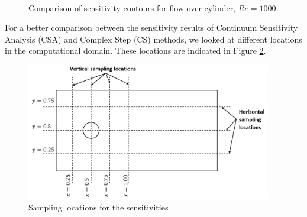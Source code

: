 \documentclass[12pt]{aiaa-pretty}
\begin{document}
\begin{figure}[H]
{	}
	\\
	\quad
	\caption{Comparison of sensitivity contours for flow over cylinder, $Re = 1000$.}
	\label{fig:cylinderSensitivityContourRE1000}
\end{figure}
%

For a better comparison between the sensitivity results of Continuum Sensitivity Analysis (CSA) and Complex Step (CS) methods, we looked at different locations in the computational domain. These locations are indicated in Figure \ref{fig:cylinderSampleLocations}.

%
\begin{figure}[H]
	\centering
	\includegraphics[height=6.0cm]{figure/cylinder/sampling_location.png}
	\caption{Sampling locations for the sensitivities}
	\label{fig:cylinderSampleLocations}
\end{figure}
%
\end{document}
